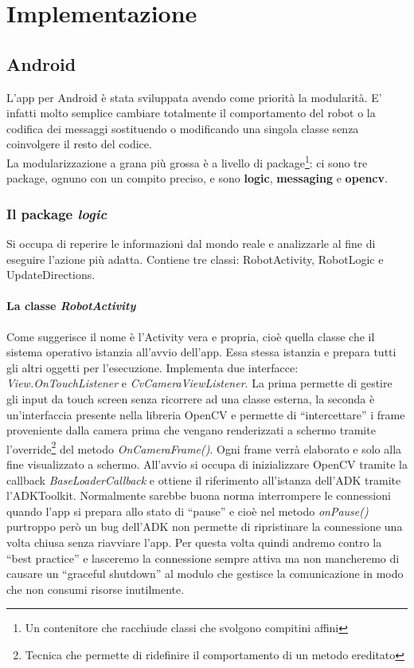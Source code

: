 \chapter{Implementazione}
\fancyfoot[C]{\thepage }
\section {Android}
L'app per Android è stata sviluppata avendo come priorità la modularità. E' 
infatti molto semplice cambiare totalmente il comportamento del robot o la 
codifica dei messaggi sostituendo o modificando una singola classe senza 
coinvolgere il resto del codice.\\
La modularizzazione a grana più grossa è a livello di package\footnote{Un contenitore 
che racchiude classi che svolgono compitini affini}: ci sono tre package,
ognuno con un compito preciso, e sono \textbf{logic}, \textbf{messaging} e \textbf{opencv}.
\subsection {Il package \textit{logic}}
Si occupa di reperire le informazioni dal mondo reale e analizzarle al fine di
eseguire l'azione più adatta.
Contiene tre classi: RobotActivity, RobotLogic e UpdateDirections.
\subsubsection{La classe \emph{RobotActivity}}
Come suggerisce il nome è l'Activity vera e propria, cioè quella classe che il 
sistema operativo istanzia all'avvio dell'app. Essa stessa istanzia e prepara tutti gli 
altri oggetti per l'esecuzione. Implementa due interfacce: \textit{View.OnTouchListener} 
e \textit{CvCameraViewListener}. 
La prima permette di gestire gli input da touch screen senza ricorrere ad una classe esterna,
la seconda è un'interfaccia presente nella libreria OpenCV e permette di ``intercettare''
i frame proveniente dalla camera prima che vengano renderizzati a schermo tramite 
l'override\footnote{Tecnica che permette di ridefinire il comportamento di un metodo 
ereditato} del metodo \textit{OnCameraFrame()}. Ogni frame verrà elaborato e solo alla
fine visualizzato a schermo.
All'avvio si occupa di inizializzare OpenCV tramite la 
callback \textit{BaseLoaderCallback} e ottiene il riferimento all'istanza dell'ADK
tramite l'ADKToolkit. Normalmente sarebbe buona norma interrompere le connessioni 
quando l'app si prepara allo stato di ``pause'' e cioè nel metodo \emph{onPause()}
 purtroppo però un bug dell'ADK non permette di ripristinare la connessione una 
 volta chiusa senza riavviare l'app. Per questa volta quindi andremo contro la 
 ``best practice'' e lasceremo la connessione sempre attiva ma non mancheremo di 
 causare un ``graceful shutdown'' al modulo che gestisce la comunicazione in modo 
 che non consumi risorse inutilmente.

